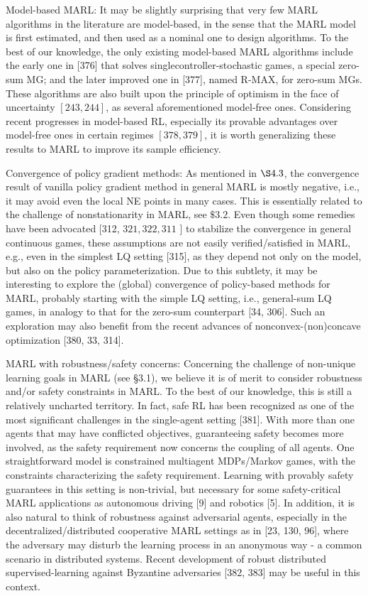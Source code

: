 \documentclass[10pt]{article}
\begin{document}
Model-based MARL: It may be slightly surprising that very few MARL algorithms in the literature are model-based, in the sense that the MARL model is first estimated, and then used as a nominal one to design algorithms. To the best of our knowledge, the only existing model-based MARL algorithms include the early one in [376] that solves singlecontroller-stochastic games, a special zero-sum MG; and the later improved one in [377], named R-MAX, for zero-sum MGs. These algorithms are also built upon the principle of optimism in the face of uncertainty $[243,244]$, as several aforementioned model-free ones. Considering recent progresses in model-based RL, especially its provable advantages over model-free ones in certain regimes $[378,379]$, it is worth generalizing these results to MARL to improve its sample efficiency.

Convergence of policy gradient methods: As mentioned in $\S 4.3$, the convergence result of vanilla policy gradient method in general MARL is mostly negative, i.e., it may avoid even the local NE points in many cases. This is essentially related to the challenge of nonstationarity in MARL, see $\$ 3.2$. Even though some remedies have been advocated [312, $321,322,311$ ] to stabilize the convergence in general continuous games, these assumptions are not easily verified/satisfied in MARL, e.g., even in the simplest LQ setting [315], as they depend not only on the model, but also on the policy parameterization. Due to this subtlety, it may be interesting to explore the (global) convergence of policy-based methods for MARL, probably starting with the simple LQ setting, i.e., general-sum LQ games, in analogy to that for the zero-sum counterpart [34, 306]. Such an exploration may also benefit from the recent advances of nonconvex-(non)concave optimization [380, 33, 314].

MARL with robustness/safety concerns: Concerning the challenge of non-unique learning goals in MARL (see §3.1), we believe it is of merit to consider robustness and/or safety constraints in MARL. To the best of our knowledge, this is still a relatively uncharted territory. In fact, safe RL has been recognized as one of the most significant challenges in the single-agent setting [381]. With more than one agents that may have conflicted objectives, guaranteeing safety becomes more involved, as the safety requirement now concerns the coupling of all agents. One straightforward model is constrained multiagent MDPs/Markov games, with the constraints characterizing the safety requirement. Learning with provably safety guarantees in this setting is non-trivial, but necessary for some safety-critical MARL applications as autonomous driving [9] and robotics [5]. In addition, it is also natural to think of robustness against adversarial agents, especially in the decentralized/distributed cooperative MARL settings as in [23, 130, 96], where the adversary may disturb the learning process in an anonymous way - a common scenario in distributed systems. Recent development of robust distributed supervised-learning against Byzantine adversaries [382, 383] may be useful in this context.
\end{document}
